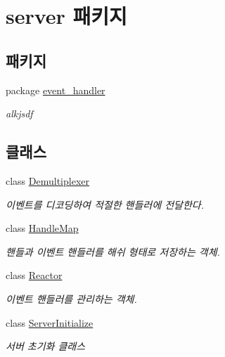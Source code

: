 \hypertarget{namespaceserver}{\section{server 패키지}
\label{namespaceserver}
}
\subsection*{패키지}
\begin{DoxyCompactItemize}
\item 
package \hyperlink{namespaceserver_1_1event__handler}{event\-\_\-handler}
\begin{DoxyCompactList}\small\item\em alkjsdf \end{DoxyCompactList}\end{DoxyCompactItemize}
\subsection*{클래스}
\begin{DoxyCompactItemize}
\item 
class \hyperlink{classserver_1_1_demultiplexer}{Demultiplexer}
\begin{DoxyCompactList}\small\item\em 이벤트를 디코딩하여 적절한 핸들러에 전달한다. \end{DoxyCompactList}\item 
class \hyperlink{classserver_1_1_handle_map}{Handle\-Map}
\begin{DoxyCompactList}\small\item\em 핸들과 이벤트 핸들러를 해쉬 형태로 저장하는 객체. \end{DoxyCompactList}\item 
class \hyperlink{classserver_1_1_reactor}{Reactor}
\begin{DoxyCompactList}\small\item\em 이벤트 핸들러를 관리하는 객체. \end{DoxyCompactList}\item 
class \hyperlink{classserver_1_1_server_initialize}{Server\-Initialize}
\begin{DoxyCompactList}\small\item\em 서버 초기화 클래스 \end{DoxyCompactList}\end{DoxyCompactItemize}
